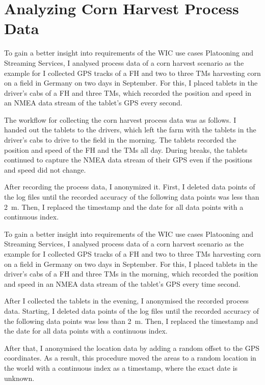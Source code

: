 \chapter{Analyzing Corn Harvest Process Data}

To gain a better insight into requirements of the \ac{WIC} use cases Platooning and Streaming Services, I analysed process data of a corn harvest scenario as the example for I collected GPS tracks of a \ac{FH} and two to three \ac{TM}s harvesting corn on a field in Germany on two days in September. For this, I placed tablets in the driver's cabs of a \ac{FH} and three \ac{TM}s, which recorded the position and speed in an NMEA data stream of the tablet's GPS every second. 

The workflow for collecting the corn harvest process data was as follows. 
I handed out the tablets to the drivers, which left the farm with the tablets in the driver's cabs to drive to the field in the morning. The tablets recorded the position and speed of the \ac{FH} and the \ac{TM}s all day. During breaks, the tablets continued to capture the NMEA data stream of their GPS even if the positions and speed did not change.

After recording the process data, I anonymized it. 
First, I deleted data points of the log files until the recorded accuracy of the following data points was less than \SI{2}{\metre}. Then, I replaced the timestamp and the date for all data points with a continuous index.

To gain a better insight into requirements of the \ac{WIC} use cases Platooning and Streaming Services, I analysed process data of a corn harvest scenario as the example for I collected GPS tracks of a \ac{FH} and two to three \ac{TM}s harvesting corn on a field in Germany on two days in September. For this, I placed tablets in the driver's cabs of a \ac{FH} and three \ac{TM}s in the morning, which recorded the position and speed in an NMEA data stream of the tablet's GPS every time second. 

After I collected the tablets in the evening, I anonymised the recorded process data. 
Starting, I deleted data points of the log files until the recorded accuracy of the following data points was less than \SI{2}{\metre}. Then, I replaced the timestamp and the date for all data points with a continuous index.

After that, I anonymised the location data by adding a random offset to the GPS coordinates. As a result, this procedure moved the areas to a random location in the world with a continuous index as a timestamp, where the exact date is unknown.

